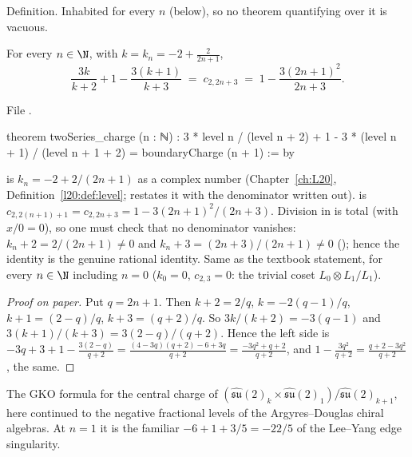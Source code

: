 \begin{status}
Definition. Inhabited for every $n$ (below), so no theorem quantifying over it is vacuous.
\end{status}

\begin{theorem}\label{l29:thm:charge}
For every $n\in\N$, with $k=k_n=-2+\frac{2}{2n+1}$,
\begin{equation*}
\frac{3k}{k+2}+1-\frac{3(k+1)}{k+3}\;=\;c_{2,2n+3}\;=\;1-\frac{3(2n+1)^2}{2n+3}.
\end{equation*}
\end{theorem}

\noindent File .
\begin{leancode}
theorem twoSeries_charge (n : ℕ) :
    3 * level n / (level n + 2) + 1 - 3 * (level n + 1) / (level n + 1 + 2) =
      boundaryCharge (n + 1) := by
\end{leancode}

\begin{dictionary}
 is $k_n=-2+2/(2n+1)$ as a complex number (Chapter~\ref{ch:L20}, Definition~\ref{l20:def:level};
 restates it with the denominator written out).  is
$c_{2,2(n+1)+1}=c_{2,2n+3}=1-3(2n+1)^2/(2n+3)$. Division in  is total (with $x/0=0$), so one must check that no
denominator vanishes: $k_n+2=2/(2n+1)\ne0$ and $k_n+3=(2n+3)/(2n+1)\ne0$ (); hence the
identity is the genuine rational identity. Same as the textbook statement, for every $n\in\N$ including $n=0$
($k_0=0$, $c_{2,3}=0$: the trivial coset $L_0\otimes L_1/L_1$).
\end{dictionary}

\begin{proof}[Proof on paper]
Put $q=2n+1$. Then $k+2=2/q$, $k=-2(q-1)/q$, $k+1=(2-q)/q$, $k+3=(q+2)/q$. So $3k/(k+2)=-3(q-1)$ and
$3(k+1)/(k+3)=3(2-q)/(q+2)$. Hence the left side is
$-3q+3+1-\frac{3(2-q)}{q+2}=\frac{(4-3q)(q+2)-6+3q}{q+2}=\frac{-3q^2+q+2}{q+2}$, and
$1-\frac{3q^2}{q+2}=\frac{q+2-3q^2}{q+2}$, the same.
\end{proof}

\begin{physics}
The GKO formula for the central charge of $(\widehat{\mathfrak{su}}(2)_k\times\widehat{\mathfrak{su}}(2)_1)/
\widehat{\mathfrak{su}}(2)_{k+1}$, here continued to the negative fractional levels of the Argyres--Douglas chiral
algebras. At $n=1$ it is the familiar $-6+1+3/5=-22/5$ of the Lee--Yang edge singularity.
\end{physics}

